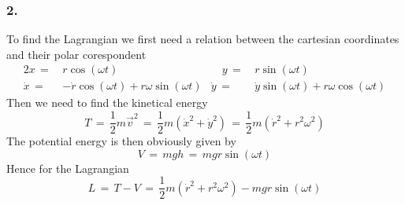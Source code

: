 \subsubsection{2.}
To find the Lagrangian we first need a relation between the cartesian
coordinates and their polar corespondent
\begin{alignat*}{2}
 x \,=\,& r \cos(\omega t)  &\quad y \,=\,& r \sin(\omega t) \\   
 \dot x \,=\,& -\dot r \cos(\omega t) + r \omega \sin(\omega t)   & \dot y  
    \,=\,& \dot y \sin(\omega t) + r \omega \cos(\omega t) 
\end{alignat*}
Then we need to find the kinetical energy
\begin{equation*}
  T \,=\, \frac{1}{2} m \vec v^2 \,=\, \frac{1}{2} m ( \dot x^2 + \dot y^2 )
\,=\, \frac{1}{2} m ( \dot r^2 + r^2 \omega^2 )
\end{equation*}
The potential energy is then obviously given by
\begin{equation*}
  V \,=\, mgh \,=\, mg r \sin(\omega t)
\end{equation*}
Hence for the Lagrangian
\begin{equation*}
  L \,=\, T - V \,=\, \frac{1}{2} m (\dot r^2 + r^2 \omega^2) - mg r \sin
(\omega t)
\end{equation*}
